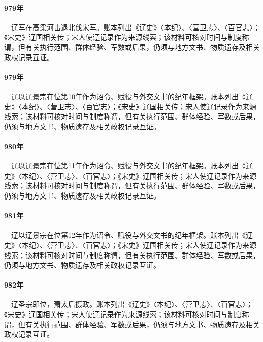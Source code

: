 \paragraph{979年}　辽军在高梁河击退北伐宋军。账本列出《辽史》〈本纪〉、〈营卫志〉、〈百官志〉；《宋史》辽国相关传；宋人使辽记录作为来源线索；该材料可核对时间与制度称谓，但有关执行范围、群体经验、军数或后果，仍须与地方文书、物质遗存及相关政权记录互证。

\paragraph{979年}　辽以辽景宗在位第10年作为诏令、赋役与外交文书的纪年框架。账本列出《辽史》〈本纪〉、〈营卫志〉、〈百官志〉；《宋史》辽国相关传；宋人使辽记录作为来源线索；该材料可核对时间与制度称谓，但有关执行范围、群体经验、军数或后果，仍须与地方文书、物质遗存及相关政权记录互证。

\paragraph{980年}　辽以辽景宗在位第11年作为诏令、赋役与外交文书的纪年框架。账本列出《辽史》〈本纪〉、〈营卫志〉、〈百官志〉；《宋史》辽国相关传；宋人使辽记录作为来源线索；该材料可核对时间与制度称谓，但有关执行范围、群体经验、军数或后果，仍须与地方文书、物质遗存及相关政权记录互证。

\paragraph{981年}　辽以辽景宗在位第12年作为诏令、赋役与外交文书的纪年框架。账本列出《辽史》〈本纪〉、〈营卫志〉、〈百官志〉；《宋史》辽国相关传；宋人使辽记录作为来源线索；该材料可核对时间与制度称谓，但有关执行范围、群体经验、军数或后果，仍须与地方文书、物质遗存及相关政权记录互证。

\paragraph{982年}　辽圣宗即位，萧太后摄政。账本列出《辽史》〈本纪〉、〈营卫志〉、〈百官志〉；《宋史》辽国相关传；宋人使辽记录作为来源线索；该材料可核对时间与制度称谓，但有关执行范围、群体经验、军数或后果，仍须与地方文书、物质遗存及相关政权记录互证。

